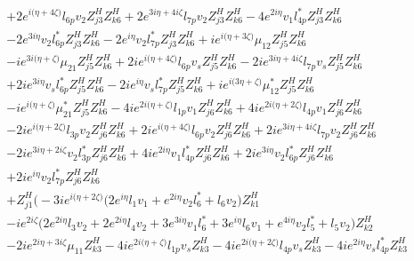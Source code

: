 \begin{align}
 &+2 e^{i \Big(\eta +4 \zeta \Big)} l_{6p} v_2 Z_{{j 3}}^{H} Z_{{k 6}}^{H} +2 e^{3 i \eta +4 i \zeta } l_{7p} v_2 Z_{{j 3}}^{H} Z_{{k 6}}^{H} -4 e^{2 i \eta } v_1 l_{4p}^* Z_{{j 3}}^{H} Z_{{k 6}}^{H} \nonumber \\ 
 &-2 e^{3 i \eta } v_2 l_{6p}^* Z_{{j 3}}^{H} Z_{{k 6}}^{H} -2 e^{i \eta } v_2 l_{7p}^* Z_{{j 3}}^{H} Z_{{k 6}}^{H} +i e^{i \Big(\eta +3 \zeta \Big)} \mu_{12} Z_{{j 5}}^{H} Z_{{k 6}}^{H} \nonumber \\ 
 &-i e^{3 i \Big(\eta +\zeta \Big)} \mu_{21} Z_{{j 5}}^{H} Z_{{k 6}}^{H} +2 i e^{i \Big(\eta +4 \zeta \Big)} l_{6p} v_s Z_{{j 5}}^{H} Z_{{k 6}}^{H} -2 i e^{3 i \eta +4 i \zeta } l_{7p} v_s Z_{{j 5}}^{H} Z_{{k 6}}^{H} \nonumber \\ 
 &+2 i e^{3 i \eta } v_s l_{6p}^* Z_{{j 5}}^{H} Z_{{k 6}}^{H} -2 i e^{i \eta } v_s l_{7p}^* Z_{{j 5}}^{H} Z_{{k 6}}^{H} +i e^{i \Big(3 \eta +\zeta \Big)} \mu_{12}^* Z_{{j 5}}^{H} Z_{{k 6}}^{H} \nonumber \\ 
 &-i e^{i \Big(\eta +\zeta \Big)} \mu_{21}^* Z_{{j 5}}^{H} Z_{{k 6}}^{H} -4 i e^{2 i \Big(\eta +\zeta \Big)} l_{1p} v_1 Z_{{j 6}}^{H} Z_{{k 6}}^{H} +4 i e^{2 i \Big(\eta +2 \zeta \Big)} l_{4p} v_1 Z_{{j 6}}^{H} Z_{{k 6}}^{H} \nonumber \\ 
 &-2 i e^{i \Big(\eta +2 \zeta \Big)} l_{3p} v_2 Z_{{j 6}}^{H} Z_{{k 6}}^{H} +2 i e^{i \Big(\eta +4 \zeta \Big)} l_{6p} v_2 Z_{{j 6}}^{H} Z_{{k 6}}^{H} +2 i e^{3 i \eta +4 i \zeta } l_{7p} v_2 Z_{{j 6}}^{H} Z_{{k 6}}^{H} \nonumber \\ 
 &-2 i e^{3 i \eta +2 i \zeta } v_2 l_{3p}^* Z_{{j 6}}^{H} Z_{{k 6}}^{H} +4 i e^{2 i \eta } v_1 l_{4p}^* Z_{{j 6}}^{H} Z_{{k 6}}^{H} +2 i e^{3 i \eta } v_2 l_{6p}^* Z_{{j 6}}^{H} Z_{{k 6}}^{H} \nonumber \\ 
 &+2 i e^{i \eta } v_2 l_{7p}^* Z_{{j 6}}^{H} Z_{{k 6}}^{H} \nonumber \\ 
 &+Z_{{j 1}}^{H} \Big(-3 i e^{i \Big(\eta +2 \zeta \Big)} \Big(2 e^{i \eta } l_1 v_1  + e^{2 i \eta } v_2 l_6^*  + l_6 v_2 \Big)Z_{{k 1}}^{H} \nonumber \\ 
 &-i e^{2 i \zeta } \Big(2 e^{2 i \eta } l_3 v_2  + 2 e^{2 i \eta } l_4 v_2  + 3 e^{3 i \eta } v_1 l_6^*  + 3 e^{i \eta } l_6 v_1  + e^{4 i \eta } v_2 l_5^*  + l_5 v_2 \Big)Z_{{k 2}}^{H} \nonumber \\ 
 &-2 i e^{2 i \eta +3 i \zeta } \mu_{11} Z_{{k 3}}^{H} -4 i e^{2 i \Big(\eta +\zeta \Big)} l_{1p} v_s Z_{{k 3}}^{H} -4 i e^{2 i \Big(\eta +2 \zeta \Big)} l_{4p} v_s Z_{{k 3}}^{H} -4 i e^{2 i \eta } v_s l_{4p}^* Z_{{k 3}}^{H} \nonumber \\ 

\end{align}

